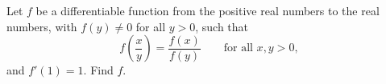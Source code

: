 Let $f$ be a differentiable function from the positive real numbers to the real numbers, with $f(y)\ne0$ for all $y>0$, such that
\[
f\!\left(\dfrac {x}{y}\right)=\dfrac{f(x)}{f(y)}\qquad\text{for all }x,y>0,
\]
and $f'(1)=1$. Find $f$.
